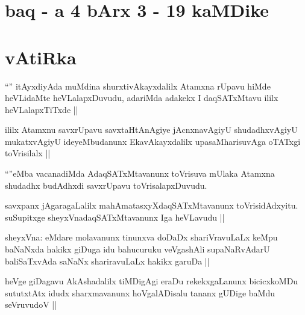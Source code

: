 \section*{baq - a 4 bArx 3 - 19 kaMDike}

\section*{vAtiRka}

\begin{artha}
``\stext'' itAyxdiyAda muMdina shurxtivAkayxdalilx Atamxna rUpavu hiMde heVLidaMte heVLalapxDuvudu, adariMda adakekx I daqSATxMtavu ililx heVLalapxTiTxde ||
\end{artha}

\begin{artha}
ililx Atamxnu savxrUpavu savxtaHtAnAgiye jAcnxnavAgiyU shudadhxvAgiyU mukatxvAgiyU ideyeMbudanunx EkavAkayxdalilx upasaMharisuvAga oTATxgi toVrisilalx ||
\end{artha}


\begin{artha}
``\stext''eMba vacanadiMda AdaqSATxMtavanunx toVrisuva mUlaka Atamxna shudadhx budAdhxdi savxrUpavu toVrisalapxDuvudu.
\end{artha}


\begin{artha}
savxpanx jAgaragaLalilx mahAmatasxyXdaqSATxMtavanunx toVrisidAdxyitu. suSupitxge sheyxVnadaqSATxMtavanunx Iga heVLavudu ||
\end{artha}


\begin{artha}
sheyxVna: eMdare molavanunx tinunxva doDaDx shariVravuLaLx keMpu baNaNxda hakikx giDuga idu bahucuruku veVgashAli supaNaRvAdarU baliSaTxvAda saNaNx shariravuLaLx hakikx garuDa ||
\end{artha}

\begin{artha}
heVge giDagavu AkAshadalilx tiMDigAgi eraDu rekekxgaLanunx bicicxkoMDu sututxtAtx idudx sharxmavanunx hoVgalADisalu tananx gUDige baMdu seVruvudoV ||
\end{artha}

